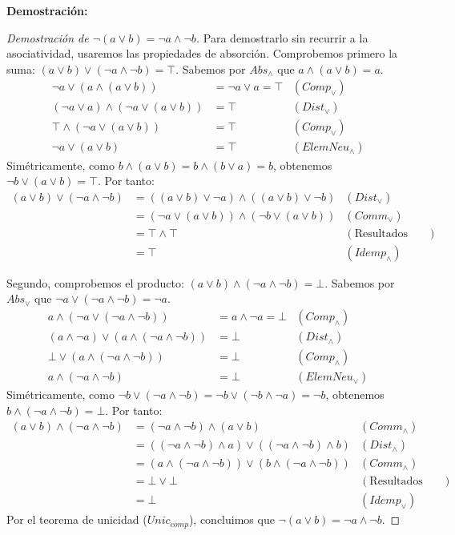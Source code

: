\documentclass[12pt,a4paper]{article}
\newcommand{\desplegable}[2]{%
  \par\vspace{1ex}\noindent
  \textbf{Demostración:}
  \vspace{1ex}
  
  #2
  \par\vspace{1ex}
}
\begin{document}
\desplegable{proof_morgan}{
\begin{proof}[Demostración de $\neg (a \vee b) = \neg a \wedge \neg b$]
Para demostrarlo sin recurrir a la asociatividad, usaremos las propiedades de absorción. Comprobemos primero la suma: $(a \vee b) \vee (\neg a \wedge \neg b) = \top$.
Sabemos por $Abs_\wedge$ que $a \wedge (a \vee b) = a$.
\begin{align*}
    \neg a \vee (a \wedge (a \vee b)) &= \neg a \vee a = \top & (Comp_\vee) \\
    (\neg a \vee a) \wedge (\neg a \vee (a \vee b)) &= \top & (Dist_\vee) \\
    \top \wedge (\neg a \vee (a \vee b)) &= \top & (Comp_\vee) \\
    \neg a \vee (a \vee b) &= \top & (ElemNeu_\wedge)
\end{align*}
Simétricamente, como $b \wedge (a \vee b) = b \wedge (b \vee a) = b$, obtenemos $\neg b \vee (a \vee b) = \top$.
Por tanto:
\begin{align*}
    (a \vee b) \vee (\neg a \wedge \neg b) &= ((a \vee b) \vee \neg a) \wedge ((a \vee b) \vee \neg b) & (Dist_\vee) \\
    &= (\neg a \vee (a \vee b)) \wedge (\neg b \vee (a \vee b)) & (Comm_\vee) \\
    &= \top \wedge \top & (\text{Resultados anteriores}) \\
    &= \top & (Idemp_\wedge)
\end{align*}

Segundo, comprobemos el producto: $(a \vee b) \wedge (\neg a \wedge \neg b) = \bot$.
Sabemos por $Abs_\vee$ que $\neg a \vee (\neg a \wedge \neg b) = \neg a$.
\begin{align*}
    a \wedge (\neg a \vee (\neg a \wedge \neg b)) &= a \wedge \neg a = \bot & (Comp_\wedge) \\
    (a \wedge \neg a) \vee (a \wedge (\neg a \wedge \neg b)) &= \bot & (Dist_\wedge) \\
    \bot \vee (a \wedge (\neg a \wedge \neg b)) &= \bot & (Comp_\wedge) \\
    a \wedge (\neg a \wedge \neg b) &= \bot & (ElemNeu_\vee)
\end{align*}
Simétricamente, como $\neg b \vee (\neg a \wedge \neg b) = \neg b \vee (\neg b \wedge \neg a) = \neg b$, obtenemos $b \wedge (\neg a \wedge \neg b) = \bot$.
Por tanto:
\begin{align*}
    (a \vee b) \wedge (\neg a \wedge \neg b) &= (\neg a \wedge \neg b) \wedge (a \vee b) & (Comm_\wedge) \\
    &= ((\neg a \wedge \neg b) \wedge a) \vee ((\neg a \wedge \neg b) \wedge b) & (Dist_\wedge) \\
    &= (a \wedge (\neg a \wedge \neg b)) \vee (b \wedge (\neg a \wedge \neg b)) & (Comm_\wedge) \\
    &= \bot \vee \bot & (\text{Resultados anteriores}) \\
    &= \bot & (Idemp_\vee)
\end{align*}
Por el teorema de unicidad ($Unic_{comp}$), concluimos que $\neg (a \vee b) = \neg a \wedge \neg b$.
\end{proof}

}
\end{document}

